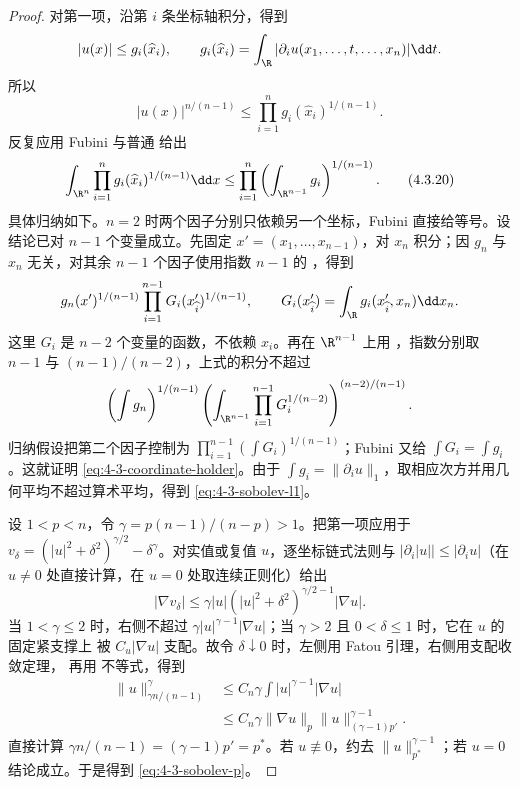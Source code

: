\begin{proof}
对第一项，沿第 $i$ 条坐标轴积分，得到
\[
 |u(x)|\leq g_i(\widehat x_i),\qquad
 g_i(\widehat x_i)=\int_\R|\partial_i u(x_1,\ldots,t,\ldots,x_n)|\dd t.
\]
所以
\[
 |u(x)|^{n/(n-1)}
 \leq\prod_{i=1}^n g_i(\widehat x_i)^{1/(n-1)}.
\]
反复应用 Fubini 与普通 \Holder{} 给出
\[
 \int_{\R^n}\prod_{i=1}^ng_i(\widehat x_i)^{1/(n-1)}\dd x
 \leq\prod_{i=1}^n
 \left(\int_{\R^{n-1}}g_i\right)^{1/(n-1)}.
 \tag{4.3.20}\label{eq:4-3-coordinate-holder}
\]
具体归纳如下。$n=2$ 时两个因子分别只依赖另一个坐标，Fubini 直接给等号。设结论已对
$n-1$ 个变量成立。先固定 $x'=(x_1,\ldots,x_{n-1})$，对 $x_n$ 积分；因 $g_n$ 与 $x_n$
无关，对其余 $n-1$ 个因子使用指数 $n-1$ 的 \Holder{}，得到
\[
 g_n(x')^{1/(n-1)}
 \prod_{i=1}^{n-1}G_i(x'_{\widehat i})^{1/(n-1)},
 \qquad
 G_i(x'_{\widehat i})=\int_\R g_i(x'_{\widehat i},x_n)\dd x_n.
\]
这里 $G_i$ 是 $n-2$ 个变量的函数，不依赖 $x_i$。再在 $\R^{n-1}$ 上用 \Holder{}，指数分别取
$n-1$ 与 $(n-1)/(n-2)$，上式的积分不超过
\[
 \left(\int g_n\right)^{1/(n-1)}
 \left(\int_{\R^{n-1}}
       \prod_{i=1}^{n-1}G_i^{1/(n-2)}\right)^{(n-2)/(n-1)}.
\]
归纳假设把第二个因子控制为
$\prod_{i=1}^{n-1}(\int G_i)^{1/(n-1)}$；Fubini 又给
$\int G_i=\int g_i$。这就证明 \eqref{eq:4-3-coordinate-holder}。由于
$\int g_i=\|\partial_i u\|_1$，取相应次方并用几何平均不超过算术平均，得到
\eqref{eq:4-3-sobolev-l1}。

设 $1<p<n$，令 $\gamma=p(n-1)/(n-p)>1$。把第一项应用于
$v_\delta=(|u|^2+\delta^2)^{\gamma/2}-\delta^\gamma$。对实值或复值 $u$，逐坐标链式法则与
$|\partial_i|u||\le |\partial_i u|$（在 $u\ne0$ 处直接计算，在 $u=0$ 处取连续正则化）给出
\[
 |\nabla v_\delta|
 \le \gamma |u|(|u|^2+\delta^2)^{\gamma/2-1}|\nabla u|.
\]
当 $1<\gamma\le2$ 时，右侧不超过
$\gamma|u|^{\gamma-1}|\nabla u|$；当 $\gamma>2$ 且 $0<\delta\le1$ 时，它在 $u$ 的固定紧支撑上
被 $C_u|\nabla u|$ 支配。故令 $\delta\downarrow0$ 时，左侧用 Fatou 引理，右侧用支配收敛定理，
再用 \Holder{} 不等式，得到
\begin{align*}
 \|u\|_{\gamma n/(n-1)}^\gamma
 &\leq C_n\gamma\int|u|^{\gamma-1}|\nabla u|\\
 &\leq C_n\gamma\|\nabla u\|_p
       \|u\|_{(\gamma-1)p'}^{\gamma-1}.
\end{align*}
直接计算
$\gamma n/(n-1)=(\gamma-1)p'=p^*$。若 $u\not\equiv0$，约去
$\|u\|_{p^*}^{\gamma-1}$；若 $u=0$ 结论成立。于是得到
\eqref{eq:4-3-sobolev-p}。


\end{proof}
